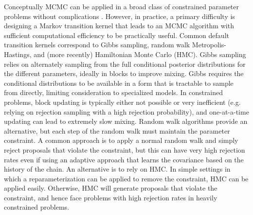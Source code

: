 \documentclass[10pt]{article}
\newcommand{\aki}[1]{\textcolor{red}{Aki: #1}}
\DeclareMathOperator{\1}{\mathbbm{1}}
\begin{document}
Conceptually MCMC can be applied in a broad class of constrained parameter problems without complications \citep{gelfand1992bayesian}. %
However, in practice, a primary difficulty is designing a Markov transition kernel that leads to an MCMC algorithm with sufficient computational efficiency to be practically useful. Common default transition kernels correspond to Gibbs sampling, random walk Metropolis-Hastings, and (more recently) Hamiltonian Monte Carlo (HMC). Gibbs sampling relies on alternately sampling from the full conditional posterior distributions for the different parameters, ideally in blocks to improve mixing. Gibbs requires the conditional distributions to be available in a form that is tractable to sample from directly, limiting consideration to specialized models. In constrained problems, block updating is typically either not possible or very inefficient (e.g. relying on rejection sampling with a high rejection probability), and one-at-a-time updating can lead to extremely slow mixing. Random walk algorithms provide an alternative, but each step of the random walk must maintain the parameter constraint. A common approach is to apply a normal random walk and simply reject proposals that violate the constraint, but this can have very high rejection rates even if using an adaptive approach that learns the covariance based on the history of the chain. An alternative is to rely on HMC. In simple settings in which a reparameterization can be applied to remove the constraint, HMC can be applied easily. Otherwise, HMC will generate proposals that violate the constraint, and hence face problems with high rejection rates in heavily constrained problems.
\end{document}
